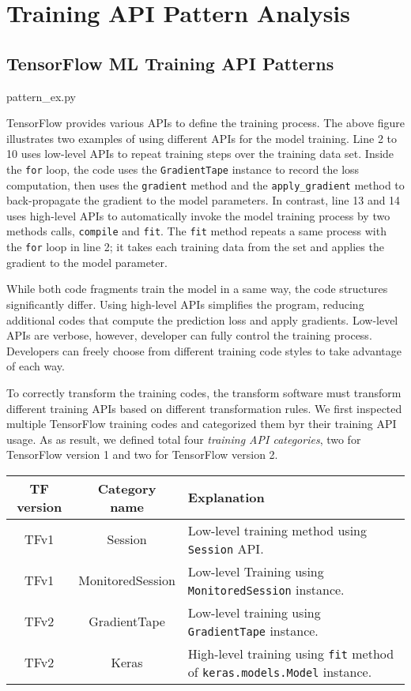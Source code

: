 \section{Training API Pattern Analysis}

\subsection{TensorFlow ML Training API Patterns}


{pattern_ex.py}

TensorFlow provides various APIs to define the training process.
The above figure illustrates two examples of using 
different APIs for the model training.
Line 2 to 10 uses low-level APIs to repeat training steps over the training
data set. Inside the {\tt for} loop, 
the code uses the {\tt GradientTape} instance to record the loss computation,
then uses the {\tt gradient} method and the {\tt apply\_gradient} method to
back-propagate the gradient to the model parameters.
In contrast, line 13 and 14 uses high-level APIs to automatically
invoke the model training process by two methods calls, {\tt compile} and
{\tt fit}. The {\tt fit} method repeats a same process with the {\tt for}
loop in line 2; it takes each training data from the set and
applies the gradient to the model parameter.

While both code fragments train the model in a same way, 
the code structures significantly differ.
Using high-level APIs simplifies the program,
reducing additional codes that compute the prediction loss and apply gradients.
Low-level APIs are verbose, however, developer can fully control
the training process.
Developers can freely choose from different training code styles to
take advantage of each way.

To correctly transform the training codes,
the transform software must transform different training APIs
based on different transformation rules. 
We first inspected multiple TensorFlow training codes and categorized them
byr their training API usage. 
As as result, we defined total four \textit{training API categories},
two for TensorFlow version 1 and two for TensorFlow version 2.

\begin{center}
  \begin{tabular}{|c|c|l|}
  \hline
  TF version & Category name & Explanation \\ 
  \hline
  TFv1 & Session & Low-level training method using {\tt Session} API. \\
  \hline
  TFv1 & MonitoredSession & Low-level Training using {\tt MonitoredSession} instance. \\
  \hline
  TFv2 & GradientTape & Low-level training using {\tt GradientTape} instance. \\
  \hline
  TFv2 & Keras & High-level training using {\tt fit} method of {\tt keras.models.Model} instance. \\
  \hline
\end{tabular}
\end{center}

